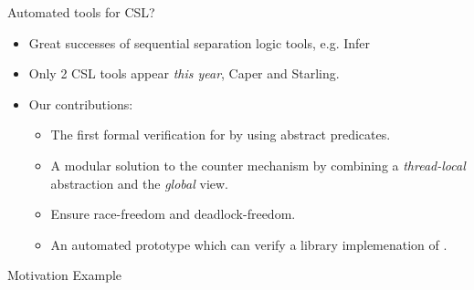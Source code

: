 \documentclass[11pt]{beamer}
\begin{document}

\begin{frame}{Automated tools for CSL?}
  \begin{itemize}
  \item Great successes of sequential separation logic tools, e.g. Infer
  \item Only 2 CSL tools appear \textit{this year}, Caper and Starling.
    \pause
  \item Our contributions:
    \begin{itemize}
    \item The first formal verification for {\CDL} by using abstract predicates.
    \item A modular solution to the counter mechanism by combining a
      \textit{thread-local} abstraction and the \textit{global} view.
    \item Ensure race-freedom and deadlock-freedom.
    \item An automated prototype which can verify a library implemenation of {\CDL}.
    \end{itemize}
  \end{itemize}
 \end{frame}

\begin{frame}{Motivation Example}

\end{frame}
\end{document}

